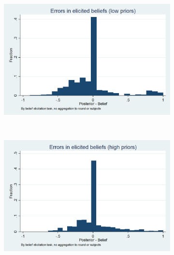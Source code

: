 \documentclass[11pt,a4paper]{article}
\begin{document}
\begin{figure}[H]
\centering
\caption{Belief Updating By Priors}
\begin{subfigure}[t]{.8\textwidth}
  \centering
  \includegraphics[width=\textwidth]{Graphs/hist_belief_error_low.png}
\end{subfigure}
~
\begin{subfigure}[t]{.8\textwidth}
  \centering
  \includegraphics[width=\textwidth]{Graphs/hist_belief_error_high.png}
\end{subfigure}
\end{figure}
\end{document}
